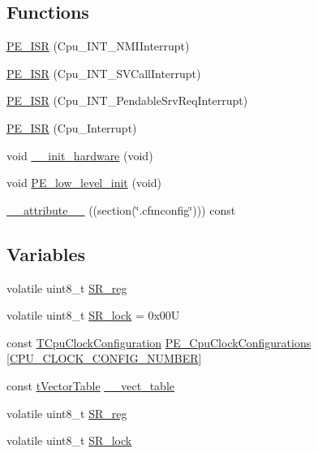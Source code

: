 \subsection*{Functions}
\begin{DoxyCompactItemize}
\item 
\hyperlink{group___cpu__module_ga89f6e345028fe4a0a105f4f95e1bb85c}{P\+E\+\_\+\+I\+SR} (Cpu\+\_\+\+I\+N\+T\+\_\+\+N\+M\+I\+Interrupt)
\item 
\hyperlink{group___cpu__module_ga868a46e58b40be38fc1a305364a62352}{P\+E\+\_\+\+I\+SR} (Cpu\+\_\+\+I\+N\+T\+\_\+\+S\+V\+Call\+Interrupt)
\item 
\hyperlink{group___cpu__module_ga26ea2ad11cf4d258eaccdc3b386e8e1f}{P\+E\+\_\+\+I\+SR} (Cpu\+\_\+\+I\+N\+T\+\_\+\+Pendable\+Srv\+Req\+Interrupt)
\item 
\hyperlink{group___cpu__module_gafa0067fa0d355a26ca9894983c01be6f}{P\+E\+\_\+\+I\+SR} (Cpu\+\_\+\+Interrupt)
\item 
void \hyperlink{group___cpu__module_ga32a8d86789a3326b3120bf1e1c1d4252}{\+\_\+\+\_\+init\+\_\+hardware} (void)
\item 
void \hyperlink{group___cpu__module_ga95039f54c45f24c1b4ed640fa2f63f11}{P\+E\+\_\+low\+\_\+level\+\_\+init} (void)
\item 
\hyperlink{group___cpu__module_ga2d9b5b981f451cdf47bf43b4f9cc9e03}{\+\_\+\+\_\+attribute\+\_\+\+\_\+} ((section(\char`\"{}.cfmconfig\char`\"{}))) const
\end{DoxyCompactItemize}
\subsection*{Variables}
\begin{DoxyCompactItemize}
\item 
volatile uint8\+\_\+t \hyperlink{group___cpu__module_ga326c16dd0db38f80ec48c7727d764481}{S\+R\+\_\+reg}
\item 
volatile uint8\+\_\+t \hyperlink{group___cpu__module_ga08ee8b0f642aeef5bbbce3bb4ec1bb28}{S\+R\+\_\+lock} = 0x00U
\item 
const \hyperlink{struct_t_cpu_clock_configuration}{T\+Cpu\+Clock\+Configuration} \hyperlink{group___cpu__module_gab69281f0e90d16198a5595ed7f471441}{P\+E\+\_\+\+Cpu\+Clock\+Configurations} \mbox{[}\hyperlink{group___cpu__module_ga37d43e31f65dd620040aec363e95b5a8}{C\+P\+U\+\_\+\+C\+L\+O\+C\+K\+\_\+\+C\+O\+N\+F\+I\+G\+\_\+\+N\+U\+M\+B\+ER}\mbox{]}
\item 
const \hyperlink{structt_vector_table}{t\+Vector\+Table} \hyperlink{group___cpu__module_ga17baaa5ab2c8895394c51a01248c5195}{\+\_\+\+\_\+vect\+\_\+table}
\item 
volatile uint8\+\_\+t \hyperlink{group___cpu__module_ga326c16dd0db38f80ec48c7727d764481}{S\+R\+\_\+reg}
\item 
volatile uint8\+\_\+t \hyperlink{group___cpu__module_ga08ee8b0f642aeef5bbbce3bb4ec1bb28}{S\+R\+\_\+lock}
\end{DoxyCompactItemize}



